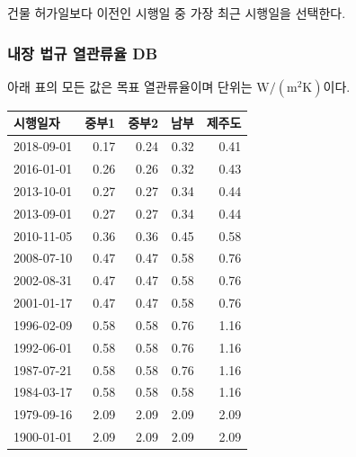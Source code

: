 건물 허가일보다 이전인 시행일 중 가장 최근 시행일을 선택한다.

\subsubsection{내장 법규 열관류율 DB}

아래 표의 모든 값은 목표 열관류율이며 단위는
$\mathrm{W/(m^2K)}$이다.

\begin{defaulttable}
  \caption{\texttt{unknown} 외벽에 적용되는 열관류율
    $[\mathrm{W/(m^2K)}]$}
  \label{tbl:unknown-db-wall}
  {\small
  \renewcommand{\arraystretch}{1.05}
  \begin{tabular}{lrrrr}
    \toprule
    시행일자 & 중부1 & 중부2 & 남부 & 제주도 \\ \midrule
    2018-09-01 & 0.17 & 0.24 & 0.32 & 0.41 \\
    2016-01-01 & 0.26 & 0.26 & 0.32 & 0.43 \\
    2013-10-01 & 0.27 & 0.27 & 0.34 & 0.44 \\
    2013-09-01 & 0.27 & 0.27 & 0.34 & 0.44 \\
    2010-11-05 & 0.36 & 0.36 & 0.45 & 0.58 \\
    2008-07-10 & 0.47 & 0.47 & 0.58 & 0.76 \\
    2002-08-31 & 0.47 & 0.47 & 0.58 & 0.76 \\
    2001-01-17 & 0.47 & 0.47 & 0.58 & 0.76 \\
    1996-02-09 & 0.58 & 0.58 & 0.76 & 1.16 \\
    1992-06-01 & 0.58 & 0.58 & 0.76 & 1.16 \\
    1987-07-21 & 0.58 & 0.58 & 0.76 & 1.16 \\
    1984-03-17 & 0.58 & 0.58 & 0.58 & 1.16 \\
    1979-09-16 & 2.09 & 2.09 & 2.09 & 2.09 \\
    1900-01-01 & 2.09 & 2.09 & 2.09 & 2.09 \\
    \bottomrule
  \end{tabular}
  }
\end{defaulttable}

